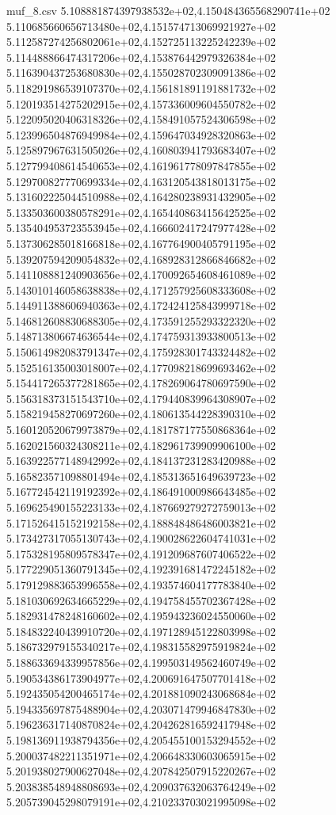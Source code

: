 \begin{filecontents*}{muf_8.csv}
5.108881874397938532e+02,4.150484365568290741e+02
5.110685660656713480e+02,4.151574713069921927e+02
5.112587274256802061e+02,4.152725113225242239e+02
5.114488866474317206e+02,4.153876442979326384e+02
5.116390437253680830e+02,4.155028702309091386e+02
5.118291986539107370e+02,4.156181891191881732e+02
5.120193514275202915e+02,4.157336009604550782e+02
5.122095020406318326e+02,4.158491057524306598e+02
5.123996504876949984e+02,4.159647034928320863e+02
5.125897967631505026e+02,4.160803941793683407e+02
5.127799408614540653e+02,4.161961778097847855e+02
5.129700827770699334e+02,4.163120543818013175e+02
5.131602225044510988e+02,4.164280238931432905e+02
5.133503600380578291e+02,4.165440863415642525e+02
5.135404953723553945e+02,4.166602417247977428e+02
5.137306285018166818e+02,4.167764900405791195e+02
5.139207594209054832e+02,4.168928312866846682e+02
5.141108881240903656e+02,4.170092654608461089e+02
5.143010146058638838e+02,4.171257925608333608e+02
5.144911388606940363e+02,4.172424125843999718e+02
5.146812608830688305e+02,4.173591255293322320e+02
5.148713806674636544e+02,4.174759313933800513e+02
5.150614982083791347e+02,4.175928301743324482e+02
5.152516135003018007e+02,4.177098218699693462e+02
5.154417265377281865e+02,4.178269064780697590e+02
5.156318373151543710e+02,4.179440839964308907e+02
5.158219458270697260e+02,4.180613544228390310e+02
5.160120520679973879e+02,4.181787177550868364e+02
5.162021560324308211e+02,4.182961739909906100e+02
5.163922577148942992e+02,4.184137231283420988e+02
5.165823571098801494e+02,4.185313651649639723e+02
5.167724542119192392e+02,4.186491000986643485e+02
5.169625490155223133e+02,4.187669279272759013e+02
5.171526415152192158e+02,4.188848486486003821e+02
5.173427317055130743e+02,4.190028622604741031e+02
5.175328195809578347e+02,4.191209687607406522e+02
5.177229051360791345e+02,4.192391681472245182e+02
5.179129883653996558e+02,4.193574604177783840e+02
5.181030692634665229e+02,4.194758455702367428e+02
5.182931478248160602e+02,4.195943236024550060e+02
5.184832240439910720e+02,4.197128945122803998e+02
5.186732979155340217e+02,4.198315582975919824e+02
5.188633694339957856e+02,4.199503149562460749e+02
5.190534386173904977e+02,4.200691647507701418e+02
5.192435054200465174e+02,4.201881090243068684e+02
5.194335697875488904e+02,4.203071479946847830e+02
5.196236317140870824e+02,4.204262816592417948e+02
5.198136911938794356e+02,4.205455100153294552e+02
5.200037482211351971e+02,4.206648330603065915e+02
5.201938027900627048e+02,4.207842507915220267e+02
5.203838548948808693e+02,4.209037632063764249e+02
5.205739045298079191e+02,4.210233703021995098e+02

\end{filecontents*}
